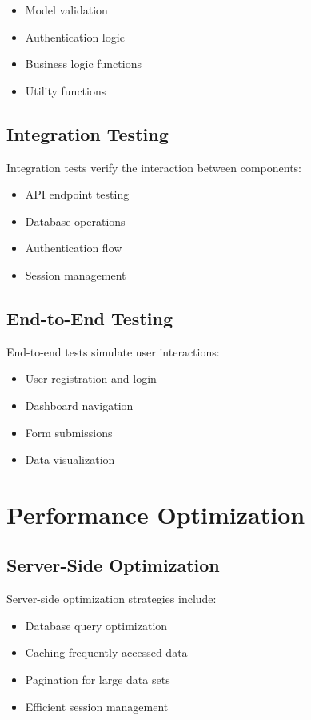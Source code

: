 \documentclass[12pt,a4paper]{report}
\begin{document}
\begin{itemize}
    \item Model validation
    \item Authentication logic
    \item Business logic functions
    \item Utility functions
\end{itemize}

\section{Integration Testing}
Integration tests verify the interaction between components:

\begin{itemize}
    \item API endpoint testing
    \item Database operations
    \item Authentication flow
    \item Session management
\end{itemize}

\section{End-to-End Testing}
End-to-end tests simulate user interactions:

\begin{itemize}
    \item User registration and login
    \item Dashboard navigation
    \item Form submissions
    \item Data visualization
\end{itemize}

\chapter{Performance Optimization}

\section{Server-Side Optimization}
Server-side optimization strategies include:

\begin{itemize}
    \item Database query optimization
    \item Caching frequently accessed data
    \item Pagination for large data sets
    \item Efficient session management
\end{itemize}
\end{document}
